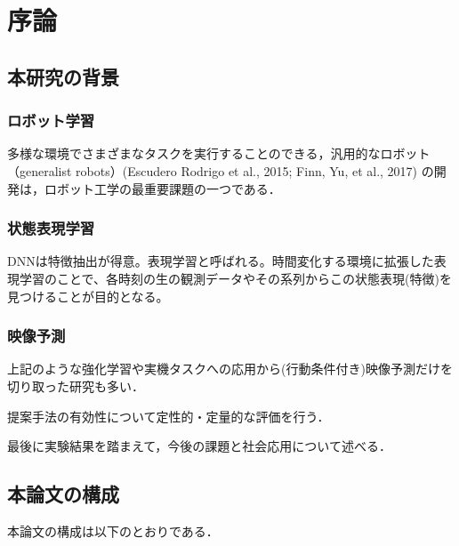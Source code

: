 \chapter{序論}
\label{chap:introduction}
\section{本研究の背景}

\subsection{ロボット学習}
多様な環境でさまざまなタスクを実行することのできる，汎用的なロボット（generalist robots）(Escudero Rodrigo et al., 2015; Finn, Yu, et al., 2017) の開発は，ロボット工学の最重要課題の一つである．

\subsection{状態表現学習}
DNNは特徴抽出が得意。表現学習と呼ばれる。時間変化する環境に拡張した表現学習のことで、各時刻の生の観測データやその系列からこの状態表現(特徴)を見つけることが目的となる。

\subsection{映像予測}
上記のような強化学習や実機タスクへの応用から(行動条件付き)映像予測だけを切り取った研究も多い．

提案手法の有効性について定性的・定量的な評価を行う．

最後に実験結果を踏まえて，今後の課題と社会応用について述べる．
  
\section{本論文の構成}
本論文の構成は以下のとおりである．







